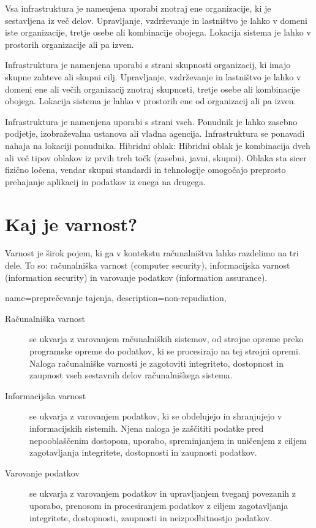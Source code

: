 \documentclass[12pt,a4paper,openany]{book}
\begin{document}
\begin{description}[style=nextline]
	\item[Zasebni oblak] Vsa infrastruktura je namenjena uporabi znotraj ene organizacije, ki je sestavljena iz več delov. Upravljanje, vzdrževanje in lastništvo je lahko v domeni iste organizacije, tretje osebe ali kombinacije obojega. Lokacija sistema je lahko v prostorih organizacije ali pa izven.

	\item[Skupni oblak] Infrastruktura je namenjena uporabi s strani skupnosti organizacij, ki imajo skupne zahteve ali skupni cilj. Upravljanje, vzdrževanje in lastništvo je lahko v domeni ene ali večih organizacij znotraj skupnosti, tretje osebe ali kombinacije obojega. Lokacija sistema je lahko v prostorih ene od organizacij ali pa izven.

	\item[Javni oblak] Infrastruktura je namenjena uporabi s strani vseh. Ponudnik je lahko zasebno podjetje, izobraževalna ustanova ali vladna agencija. Infrastruktura se ponavadi nahaja na lokaciji ponudnika.
	Hibridni oblak: Hibridni oblak je kombinacija dveh ali več tipov oblakov iz prvih treh točk (zasebni, javni, skupni). Oblaka sta sicer fizično ločena, vendar skupni standardi in tehnologije omogočajo preprosto prehajanje aplikacij in podatkov iz enega na drugega.
\end{description}

\section{Kaj je varnost?}
Varnost je širok pojem, ki ga v kontekstu računalništva lahko razdelimo na tri dele. To so: računalniška varnost (computer security), informacijska varnost (information security) in varovanje podatkov (information assurance).

{
  name=preprečevanje tajenja,
  description={non-repudiation},
}

\begin{description}

	\item[Računalniška varnost] se ukvarja z varovanjem računalniških sistemov, od strojne opreme preko programske opreme do podatkov, ki se procesirajo na tej strojni opremi. Naloga računalniške varnosti je zagotoviti integriteto, dostopnost in zaupnost vseh sestavnih delov računalniškega sistema.

\item[Informacijska varnost] se ukvarja z varovanjem podatkov, ki se obdelujejo in shranjujejo v informacijskih sistemih. Njena naloga je zaščititi podatke pred nepooblaščenim dostopom, uporabo, spreminjanjem in uničenjem z ciljem zagotavljanja integritete, dostopnosti in zaupnosti podatkov.

\item[Varovanje podatkov] se ukvarja z varovanjem podatkov in upravljanjem tveganj povezanih z uporabo, prenosom in procesiranjem podatkov z ciljem zagotavljanja integritete, dostopnosti, zaupnosti in neizpodbitnostjo podatkov.
\end{description}
\end{document}
